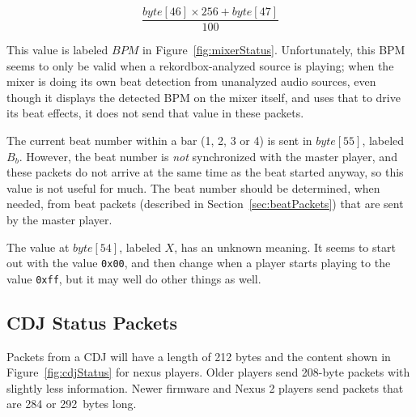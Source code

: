 \documentclass[11pt]{article}
\begin{document}
\[ \frac{byte[46] \times 256 + byte[47]}{100} \]

This value is labeled $BPM$ in Figure~\ref{fig:mixerStatus}.
Unfortunately, this BPM seems to only be valid when a
rekordbox-analyzed source is playing; when the mixer is doing its own
beat detection from unanalyzed audio sources, even though it displays
the detected BPM on the mixer itself, and uses that to drive its beat
effects, it does not send that value in these packets.

The current beat number within a bar (1, 2, 3 or 4) is sent in
$byte[55]$, labeled $B_b$. However, the beat number is \emph{not}
synchronized with the master player, and these packets do not arrive
at the same time as the beat started anyway, so this value is not
useful for much. The beat number should be determined, when needed,
from beat packets (described in Section~\ref{sec:beatPackets}) that
are sent by the master player.

The value at $byte[54]$, labeled $X$, has an unknown meaning. It
seems to start out with the value {\tt 0x00}, and then change when a
player starts playing to the value {\tt 0xff}, but it may well do
other things as well.

\subsection{CDJ Status Packets}

Packets from a CDJ will have a length of 212 bytes and the content
shown in Figure~\ref{fig:cdjStatus} for nexus players. Older players
send 208-byte packets with slightly less information. Newer firmware
and Nexus 2 players send packets that are 284 or 292~bytes long.
\end{document}
